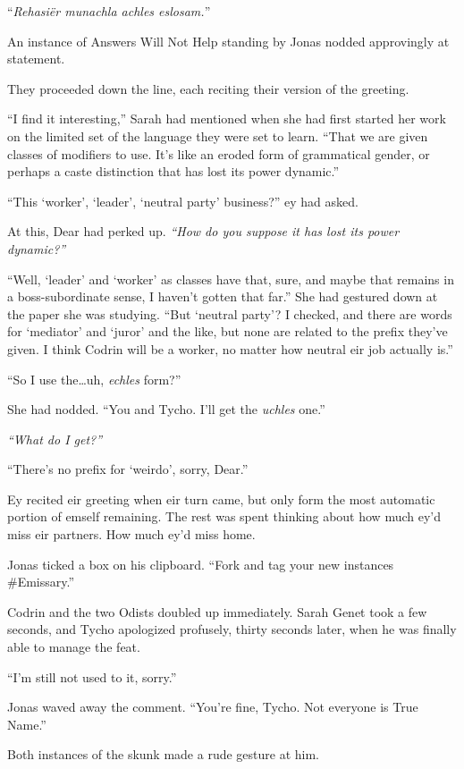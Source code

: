 ``\emph{Rehasiër munachla achles eslosam.}''

An instance of Answers Will Not Help standing by Jonas nodded approvingly at statement.

They proceeded down the line, each reciting their version of the greeting.

``I find it interesting,'' Sarah had mentioned when she had first started her work on the limited set of the language they were set to learn. ``That we are given classes of modifiers to use. It's like an eroded form of grammatical gender, or perhaps a caste distinction that has lost its power dynamic.''

``This `worker', `leader', `neutral party' business?'' ey had asked.

At this, Dear had perked up. \emph{``How do you suppose it has lost its power dynamic?''}

``Well, `leader' and `worker' as classes have that, sure, and maybe that remains in a boss-subordinate sense, I haven't gotten that far.'' She had gestured down at the paper she was studying. ``But `neutral party'? I checked, and there are words for `mediator' and `juror' and the like, but none are related to the prefix they've given. I think Codrin will be a worker, no matter how neutral eir job actually is.''

``So I use the\ldots uh, \emph{echles} form?''

She had nodded. ``You and Tycho. I'll get the \emph{uchles} one.''

\emph{``What do I get?''}

``There's no prefix for `weirdo', sorry, Dear.''

Ey recited eir greeting when eir turn came, but only form the most automatic portion of emself remaining. The rest was spent thinking about how much ey'd miss eir partners. How much ey'd miss home.

Jonas ticked a box on his clipboard. ``Fork and tag your new instances \#Emissary.''

Codrin and the two Odists doubled up immediately. Sarah Genet took a few seconds, and Tycho apologized profusely, thirty seconds later, when he was finally able to manage the feat.

``I'm still not used to it, sorry.''

Jonas waved away the comment. ``You're fine, Tycho. Not everyone is True Name.''

Both instances of the skunk made a rude gesture at him.

